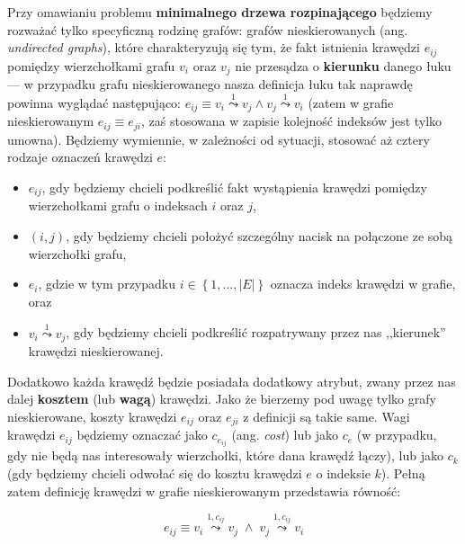 Przy omawianiu problemu \textbf{minimalnego drzewa rozpinającego} będziemy rozważać tylko specyficzną rodzinę grafów: grafów nieskierowanych (ang. \textit{undirected graphs}), które charakteryzują się tym, że fakt istnienia krawędzi $e_{ij}$ pomiędzy wierzchołkami grafu $v_{i}$ oraz $v_{j}$ nie przesądza o \textbf{kierunku} danego łuku --- w przypadku grafu nieskierowanego nasza definicja łuku tak naprawdę powinna wyglądać następująco: $e_{ij} \equiv v_{i} \overset{1}{\leadsto} v_{j} \wedge v_{j} \overset{1}{\leadsto} v_{i}$ (zatem w grafie nieskierowanym $e_{ij} \equiv e_{ji}$, zaś stosowana w zapisie kolejność indeksów jest tylko umowna). Będziemy wymiennie, w zależności od sytuacji, stosować aż cztery rodzaje oznaczeń krawędzi $e$:
\begin{itemize}
	\item $e_{ij}$, gdy będziemy chcieli podkreślić fakt wystąpienia krawędzi pomiędzy wierzchołkami grafu o indeksach $i$ oraz $j$,
	\item $\left( i, j \right)$, gdy będziemy chcieli położyć szczególny nacisk na połączone ze sobą wierzchołki grafu,
	\item $e_{i}$, gdzie w tym przypadku $i \in \left\{ 1, \dots, \left| E \right| \right\}$ oznacza indeks krawędzi w grafie, oraz
	\item $v_{i} \overset{1}{\leadsto} v_{j}$, gdy będziemy chcieli podkreślić rozpatrywany przez nas ,,kierunek'' krawędzi nieskierowanej.
\end{itemize}
Dodatkowo każda krawędź będzie posiadała dodatkowy atrybut, zwany przez nas dalej \textbf{kosztem} (lub \textbf{wagą}) krawędzi. Jako że bierzemy pod uwagę tylko grafy nieskierowane, koszty krawędzi $e_{ij}$ oraz $e_{ji}$ z definicji są takie same. Wagi krawędzi $e_{ij}$ będziemy oznaczać jako $c_{e_{ij}}$ (ang. \textit{cost}) lub jako $c_{e}$ (w przypadku, gdy nie będą nas interesowały wierzchołki, które dana krawędź łączy), lub jako $c_{k}$ (gdy będziemy chcieli odwołać się do kosztu krawędzi $e$ o indeksie $k$). Pełną zatem definicję krawędzi w grafie nieskierowanym przedstawia równość:

\begin{equation}
e_{ij} \equiv v_{i} \overset{1, c_{ij}}{\leadsto} v_{j} \; \wedge \; v_{j} \overset{1, c_{ij}}{\leadsto} v_{i}
\end{equation}

